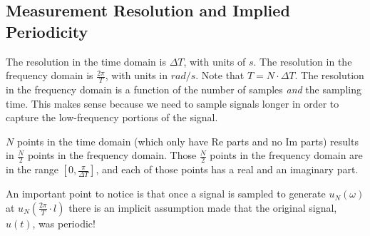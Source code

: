 \documentclass[lecture,12pt,]{pcms-l}
\theoremstyle{example}
\newcommand{\w}{\omega}
\begin{document}
\subsection{Measurement Resolution and Implied Periodicity}
The resolution in the time domain is $\Delta T$, with units of $s$. The resolution in the frequency domain is $\frac{2\pi}{T}$, with units in $rad/s$. Note that $T=N\cdot\Delta T$. The resolution in the frequency domain is a function of the number of samples \textit{and} the sampling time. This makes sense because  we need to sample signals longer in order to capture the low-frequency portions of the signal.

$N$ points in the time domain (which only have $\text{Re}$ parts and no $\text{Im}$ parts) results in $\frac{N}{2}$ points in the frequency domain. Those $\frac{N}{2}$ points in the frequency domain are in the range $[0,\frac{\pi}{\Delta T}]$, and each of those points has a real and an imaginary part.

An important point to notice is that once a signal is sampled to generate $u_N(\w)$ at $u_N(\frac{2\pi}{T}\cdot l)$ there is an implicit assumption made that the original signal, $u(t)$, was periodic!
\end{document}
